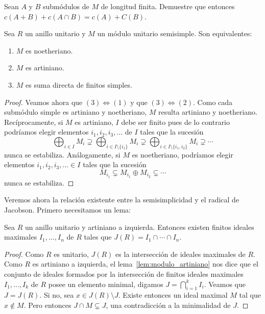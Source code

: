 \begin{exercise}
	Sean $A$ y $B$ submódulos de $M$ de longitud finita. Demuestre que entonces 
	$c(A+B)+c(A\cap B)=c(A)+C(B)$.
\end{exercise}

\begin{lemma}
	Sea $R$ un anillo unitario y $M$ un módulo unitario semisimple. Son equivalentes:
	\begin{enumerate}
		\item $M$ es noetheriano.
		\item $M$ es artiniano.
		\item $M$ es suma directa de finitos simples.
	\end{enumerate}
\end{lemma}

\begin{proof}
	Veamos ahora que $(3)\Longleftrightarrow(1)$ y que
	$(3)\Longleftrightarrow(2)$. Como cada submódulo simple es artiniano y
	noetheriano, $M$ resulta artiniano y noetheriano. Recíprocamente, si $M$ es
	artiniano, $I$ debe ser finito pues de lo contrario podríamos elegir
	elementos $i_1,i_2,i_3,\dots$ de $I$ tales que la sucesión
	\[
		\bigoplus_{i\in I}M_i\supsetneq \bigoplus_{i\in I\setminus\{i_1\}}M_i\supsetneq\bigoplus_{i\in I\setminus\{i_1,i_2\}}M_i\supsetneq\cdots
	\]
	nunca se estabiliza. Análogamente, si $M$ es noetheriano, podríamos elegir
	elementos $i_1,i_2,i_3,\dots\in I$ tales que la sucesión
	\[
		M_{i_1}\subsetneq M_{i_1}\oplus M_{i_2}\subsetneq\cdots
	\]
	nunca se estabiliza.
\end{proof}

Veremos ahora la relación existente entre la semisimplicidad y el radical de
Jacobson. Primero necesitamos un lema:

\begin{lemma}
	\label{lem:Jartiniano}
	Sea $R$ un anillo unitario y artiniano a izquierda. Entonces existen
	finitos ideales maximales $I_1,\dots,I_n$ de $R$ tales que
	$J(R)=I_1\cap\cdots\cap I_n$.
\end{lemma}

\begin{proof}
	Como $R$ es
	unitario, $J(R)$ es la intersección de ideales maximales de $R$.  Como $R$
	es artiniano a izquierda, el lema~\ref{lem:modulo_artiniano} nos dice que
	el conjunto de ideales formados por la intersección de finitos ideales
	maximales $I_1,\dots,I_k$ de $R$ posee un elemento minimal, digamos
	$J=\bigcap_{i=1}^k I_i$. Veamos que $J=J(R)$. Si no, sea $x\in
	J(R)\setminus J$.  Existe entonces un ideal maximal $M$ tal que $x\not\in
	M$. Pero entonces $J\cap M\subsetneq J$, una contradicción a la minimalidad
	de $J$. 
\end{proof}

